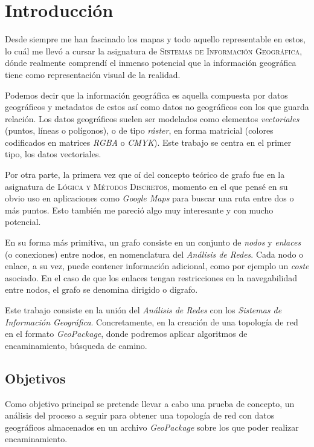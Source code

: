 \chapter{Introducción}
\label{ch:intro}
	Desde siempre me han fascinado los mapas y todo aquello representable en estos, lo cuál me llevó a cursar la asignatura de \textsc{Sistemas de Información Geográfica}, dónde realmente comprendí el inmenso potencial que la información geográfica tiene como representación visual de la realidad.
	
	Podemos decir que la información geográfica es aquella compuesta por datos geográficos y metadatos de estos así como datos no geográficos con los que guarda relación. Los datos geográficos suelen ser modelados como elementos \textit{vectoriales} (puntos, líneas o polígonos), o de tipo \textit{ráster}, en forma matricial (colores codificados en matrices \textit{RGBA} o \textit{CMYK}). Este trabajo se centra en el primer tipo, los datos vectoriales. 
	
	Por otra parte, la primera vez que oí del concepto teórico de grafo fue en la asignatura de \textsc{Lógica y Métodos Discretos}, momento en el que pensé en su obvio uso en aplicaciones como \textit{Google Maps} para buscar una ruta entre dos o más puntos. Esto también me pareció algo muy interesante y con mucho potencial.
	
	En su forma más primitiva, un grafo consiste en un conjunto de \textit{nodos} y \textit{enlaces} (o conexiones) entre nodos, en nomenclatura del \textit{Análisis de Redes}. Cada nodo o enlace, a su vez, puede contener información adicional, como por ejemplo un \textit{coste} asociado. En el caso de que los enlaces tengan restricciones en la navegabilidad entre nodos, el grafo se denomina dirigido o digrafo. 
	
	Este trabajo consiste en la unión del \textit{Análisis de Redes} con los \textit{Sistemas de Información Geográfica}. 
	Concretamente, en la creación de una topología de red en el formato \textit{GeoPackage}, donde podremos aplicar algoritmos de encaminamiento, búsqueda de camino.
	
\section{Objetivos}
	\label{sec:objectives}
	Como objetivo principal se pretende llevar a cabo una prueba de concepto, un análisis del proceso a seguir para obtener una topología de red con datos geográficos almacenados en un archivo \textit{GeoPackage} sobre los que poder realizar encaminamiento.
	
